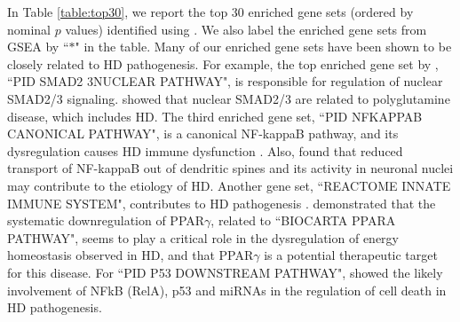 	In Table \ref{table:top30}, we report the top 30 enriched gene sets (ordered by nominal $p$ 
	values) identified using \OurMethod. We also label the enriched gene sets from GSEA by 
	``$\ast$" in the table. Many of our enriched gene sets have been shown to be closely related to 
	HD pathogenesis. For example, the top enriched gene set by \OurMethod, ``PID SMAD2 3NUCLEAR 
	PATHWAY", is responsible for regulation of nuclear SMAD2/3 signaling. 
	\citet{katsuno2010disrupted} showed that nuclear SMAD2/3 are
	related to polyglutamine disease, which includes HD. The third enriched gene set, ``PID NFKAPPAB
	CANONICAL PATHWAY", is a canonical NF-kappaB pathway, and its dysregulation causes HD immune
	dysfunction \citep{trager2014htt}. Also, \citet{marcora2010huntington} found that reduced 
	transport of NF-kappaB out of dendritic spines and its activity in neuronal nuclei may 
	contribute to the etiology of HD. 
	Another gene set, ``REACTOME INNATE IMMUNE SYSTEM", contributes to HD pathogenesis
	\citep{labadorf2015rna,trager2014htt}. %
	\citet{chiang2010modulation} demonstrated that the systematic downregulation of PPAR$\gamma$,
	related to ``BIOCARTA PPARA PATHWAY", seems to play a critical role in the dysregulation of 
	energy homeostasis observed in HD, and that PPAR$\gamma$ is a potential therapeutic target for 
	this disease. %
	For ``PID P53 DOWNSTREAM PATHWAY", \citet{ghose2011regulation} showed the likely involvement of 
	NFkB (RelA), p53 and miRNAs in the regulation of cell death in HD pathogenesis. 
	

